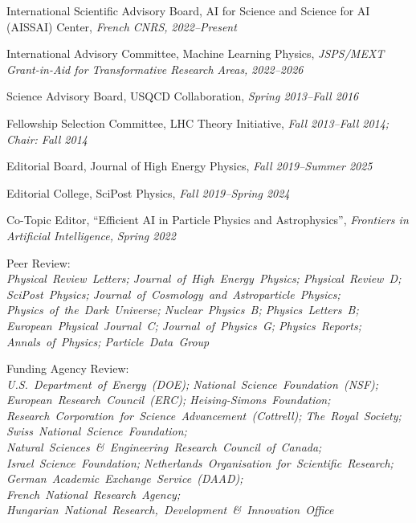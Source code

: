 \item International Scientific Advisory Board, AI for Science and Science for AI (AISSAI) Center, \emph{French CNRS, }\emph{2022--Present}
\item International Advisory Committee, Machine Learning Physics, \emph{JSPS/MEXT Grant-in-Aid for Transformative Research Areas, }\emph{2022--2026}
\item Science Advisory Board, USQCD Collaboration, \emph{Spring 2013--Fall 2016}
\item Fellowship Selection Committee, LHC Theory Initiative, \emph{Fall 2013--Fall 2014; Chair: Fall 2014}
\item Editorial Board, Journal of High Energy Physics, \emph{Fall 2019--Summer 2025}
\item Editorial College, SciPost Physics, \emph{Fall 2019--Spring 2024}
\item Co-Topic Editor, ``Efficient AI in Particle Physics and Astrophysics'', \emph{Frontiers in Artificial Intelligence, }\emph{Spring 2022}
\item \raggedright Peer Review: \\ \textit{\nohyphens{Physical~Review~Letters; Journal~of~High~Energy~Physics; Physical~Review~D; SciPost~Physics; Journal~of~Cosmology~and~Astroparticle~Physics; Physics~of~the~Dark~Universe; Nuclear~Physics~B; Physics~Letters~B; European~Physical~Journal~C; Journal~of~Physics~G; Physics~Reports; Annals~of~Physics; Particle~Data~Group}}
\item \raggedright Funding Agency Review: \\ \textit{\nohyphens{U.S.~Department~of~Energy~(DOE); National~Science~Foundation~(NSF); European~Research~Council~(ERC); Heising-Simons~Foundation; Research~Corporation~for~Science~Advancement~(Cottrell); The~Royal~Society; Swiss~National~Science~Foundation; Natural~Sciences~\&~Engineering~Research~Council~of~Canada; Israel~Science~Foundation; Netherlands~Organisation~for~Scientific~Research; German~Academic~Exchange~Service~(DAAD); French~National~Research~Agency; Hungarian~National~Research,~Development~\&~Innovation~Office}}
